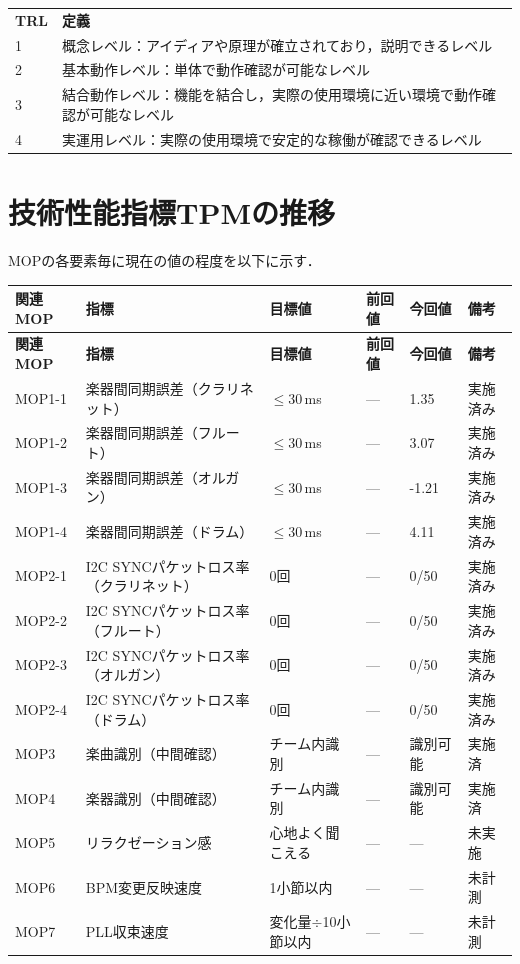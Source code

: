 \documentclass[a4paper,12pt]{ltjsarticle}
\begin{document}
\noindent
{\small
\begin{tabular}{ll}
  \textbf{TRL} & \textbf{定義} \\
  1 & 概念レベル：アイディアや原理が確立されており，説明できるレベル \\
  2 & 基本動作レベル：単体で動作確認が可能なレベル \\
  3 & 結合動作レベル：機能を結合し，実際の使用環境に近い環境で動作確認が可能なレベル \\
  4 & 実運用レベル：実際の使用環境で安定的な稼働が確認できるレベル \\
\end{tabular}
}

\section{技術性能指標TPMの推移} 
MOPの各要素毎に現在の値の程度を以下に示す．

\begin{longtable}{L{2cm}L{3cm}C{2cm}C{2cm}C{2cm}L{2.5cm}}
  \toprule
  \textbf{関連MOP} & \textbf{指標} & \textbf{目標値} & \textbf{前回値} & \textbf{今回値} & \textbf{備考} \\
  \midrule
  \endfirsthead
  \toprule
  \textbf{関連MOP} & \textbf{指標} & \textbf{目標値} & \textbf{前回値} & \textbf{今回値} & \textbf{備考} \\
  \midrule
  \endhead
  \midrule
  \endfoot
  \bottomrule
  \endlastfoot
  MOP1-1 & 楽器間同期誤差（クラリネット） & $\leq 30$\,ms & --- & 1.35 & 実施済み \\
  MOP1-2 & 楽器間同期誤差（フルート） & $\leq 30$\,ms & --- & 3.07 & 実施済み \\
  MOP1-3 & 楽器間同期誤差（オルガン） & $\leq 30$\,ms & --- & -1.21 & 実施済み \\
  MOP1-4 & 楽器間同期誤差（ドラム） & $\leq 30$\,ms & --- & 4.11 & 実施済み \\
  MOP2-1 & I2C SYNCパケットロス率（クラリネット） & 0回 & --- & 0/50 & 実施済み \\
  MOP2-2 & I2C SYNCパケットロス率（フルート） & 0回 & --- & 0/50 & 実施済み \\
  MOP2-3 & I2C SYNCパケットロス率（オルガン） & 0回 & --- & 0/50 & 実施済み \\
  MOP2-4 & I2C SYNCパケットロス率（ドラム） & 0回 & --- & 0/50 & 実施済み \\
  MOP3 & 楽曲識別（中間確認） & チーム内識別 & --- & 識別可能 & 実施済 \\
  MOP4 & 楽器識別（中間確認） & チーム内識別 & --- & 識別可能 & 実施済 \\
  MOP5 & リラクゼーション感 & 心地よく聞こえる & --- & --- & 未実施 \\
  MOP6 & BPM変更反映速度 & 1小節以内 & --- & --- & 未計測 \\
  MOP7 & PLL収束速度 & 変化量$\div$10小節以内 & --- & --- & 未計測 \\
\end{longtable}
\end{document}
